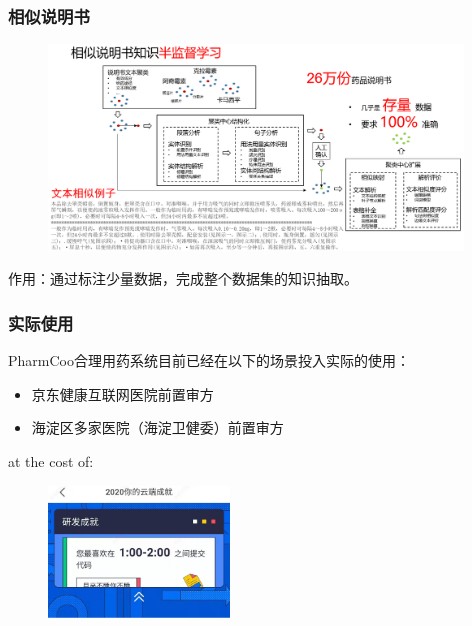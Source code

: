 \begin{frame}
\frametitle{相似说明书}

\begin{figure}
\centering
\includegraphics[width=0.98\textwidth,keepaspectratio]{images/di_similarity.png}
\end{figure}

\pause
\vspace{0.5em}

作用：通过标注少量数据，完成整个数据集的知识抽取。

\end{frame}


\begin{frame}
\frametitle{实际使用}

PharmCoo合理用药系统目前已经在以下的场景投入实际的使用：

\vspace{0.8em}

\begin{itemize}
    \item 京东健康互联网医院前置审方
    \item 海淀区多家医院（海淀卫健委）前置审方
\end{itemize}

\pause
\vspace{1em}

at the cost of:

\begin{figure}
\centering
\includegraphics[width=0.43\textwidth,keepaspectratio]{images/jd_coding_stats.jpg}
\end{figure}

\end{frame}


